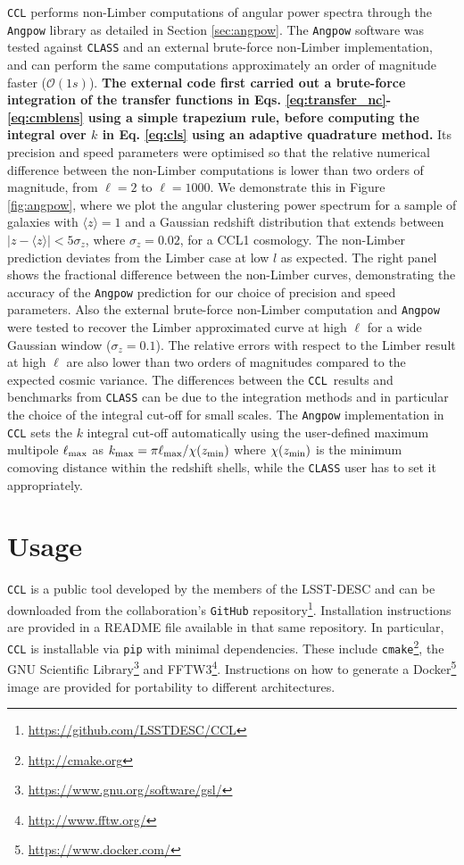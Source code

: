 \documentclass[\docopts]{\docclass}
\newcommand{\ccl}{{\tt CCL}\xspace}
\newcommand{\class}{{\tt CLASS}\xspace}
\begin{document}
\ccl performs non-Limber computations of angular power spectra through the {\tt Angpow} library as detailed in Section \ref{sec:angpow}. The \texttt{Angpow} software \citep{2017A&A...602A..72C} was tested against \class and an external brute-force non-Limber implementation, and can perform the same computations approximately an order of magnitude faster ($\mathcal{O}(1s)$). {\bf The external code first carried out a brute-force integration of the transfer functions in Eqs. \ref{eq:transfer_nc}-\ref{eq:cmblens} using a simple trapezium rule, before computing the integral over $k$ in Eq. \ref{eq:cls} using an adaptive quadrature method.} Its precision and speed parameters were optimised so that the relative numerical difference between the non-Limber computations is lower than two orders of magnitude, from $\ell=2$ to $\ell=1000$. We demonstrate this in Figure \ref{fig:angpow}, where we plot the angular clustering power spectrum for a sample of galaxies with $\langle z \rangle=1$ and a Gaussian redshift distribution that extends between $|z-\langle z \rangle|<5\sigma_z$, where $\sigma_z=0.02$, for a CCL1 cosmology. The non-Limber prediction deviates from the Limber case at low $l$ as expected. The right panel shows the fractional difference between the non-Limber curves, demonstrating the accuracy of the {\tt Angpow} prediction for our choice of precision and speed parameters. Also the external brute-force non-Limber computation and {\tt Angpow} were tested to recover the Limber approximated curve at high $\ell$ for a wide Gaussian window ($\sigma_z=0.1$). The relative errors with respect to the Limber result at high $\ell$ are also lower than two orders of magnitudes compared to the expected cosmic variance. The differences between the \ccl~results and benchmarks from \class can be due to the integration methods and in particular the choice of the integral cut-off for small scales. The {\tt Angpow} implementation in \ccl sets the $k$ integral cut-off automatically using the user-defined maximum multipole $\ell_{\rm max}$ as $k_{\rm max}=\pi \ell_{\rm max} / \chi(z_{\rm min})$ where $\chi(z_{\rm min})$ is the minimum comoving distance within the redshift shells, while the \class user has to set it appropriately.

\section{Usage}
\label{sec:usage}

\ccl is a public tool developed by the members of the LSST-DESC and can be downloaded from the collaboration's {\tt GitHub} repository\footnote{\url{https://github.com/LSSTDESC/CCL}}. Installation instructions are provided in a README file available in that same repository. In particular, \ccl is installable via {\tt pip} with minimal dependencies. These include {\tt cmake}\footnote{\url{http://cmake.org}}, the GNU Scientific Library\footnote{\url{https://www.gnu.org/software/gsl/}} and FFTW3\footnote{\url{http://www.fftw.org/}}. Instructions on how to generate a Docker\footnote{\url{https://www.docker.com/}} image are provided for portability to different architectures.
\end{document}
